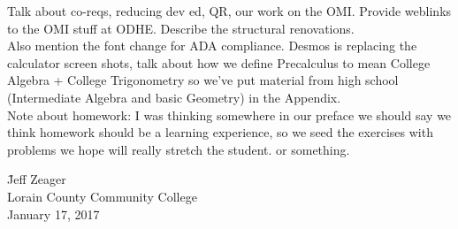 \documentclass{ximera}
\begin{document}
\noindent 


Talk about co-reqs, reducing dev ed, QR, our work on the OMI.  Provide weblinks to the OMI stuff at ODHE.  Describe the structural renovations.  
\\
Also mention the font change for ADA compliance.  Desmos is replacing the calculator screen shots,  talk about how we define Precalculus to mean College Algebra + College Trigonometry so we've put material from high school (Intermediate Algebra and basic Geometry) in the Appendix.
\\
\noindent  Note about homework:  I was thinking somewhere in our preface we should say we think homework should be a learning experience, so we seed the exercises with problems we hope will really stretch the student. or something.



\begin{tabbing}

\hspace{4in}   \= Jeff Zeager \\
               \> Lorain County Community College \\
               \> January 17, 2017
               
\end{tabbing}
\end{document}
